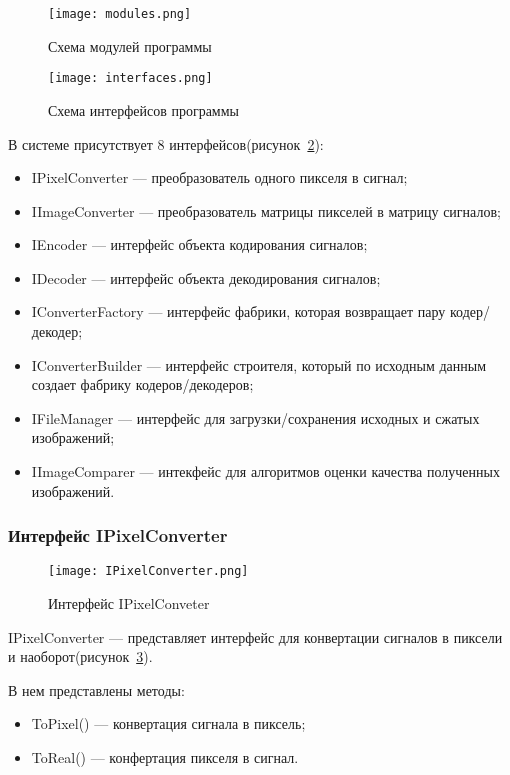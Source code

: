 \begin{figure}[ht]
\centering
  \texttt{[image: modules.png]}
  \caption{ Схема модулей программы }
  \label{fig:modules}
\end{figure}

\begin{figure}[ht]
\centering
  \texttt{[image: interfaces.png]}
  \caption{ Схема интерфейсов программы }
  \label{fig:interfaces}
\end{figure}
В системе присутствует 8 интерфейсов(рисунок~\ref{fig:interfaces}):
\begin{itemize}
  \item IPixelConverter --- преобразователь одного пикселя в сигнал;
  \item IImageConverter --- преобразователь матрицы пикселей в матрицу сигналов;
  \item IEncoder --- интерфейс объекта кодирования сигналов;
  \item IDecoder --- интерфейс объекта декодирования сигналов;
  \item IConverterFactory --- интерфейс фабрики, которая возвращает пару кодер/декодер;
  \item IConverterBuilder --- интерфейс строителя, который по исходным данным создает фабрику кодеров/декодеров;
  \item IFileManager --- интерфейс для загрузки/сохранения исходных и сжатых изображений;
  \item IImageComparer --- интекфейс для алгоритмов оценки качества полученных изображений.
\end{itemize}

\subsubsection{Интерфейс IPixelConverter}
\label{subsub:development:types:ipixelconverter}

\begin{figure}[ht]
\centering
  \texttt{[image: IPixelConverter.png]}
  \caption{ Интерфейс IPixelConveter }
  \label{fig:ipixelconverter}
\end{figure}
IPixelConverter --- представляет интерфейс для конвертации сигналов в пиксели и наоборот(рисунок~\ref{fig:ipixelconverter}).

В нем представлены методы:
\begin{itemize}
  \item ToPixel() --- конвертация сигнала в пиксель;
  \item ToReal() --- конфертация пикселя в сигнал.
\end{itemize}

